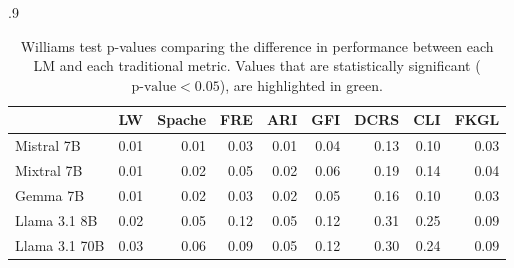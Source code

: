 \begin{table}[!htb]
    \begin{subtable}[t]{.9\textwidth}
        \centering \footnotesize
          \begin{tabular}{l|rrrrrrrr}
         & \multicolumn{1}{l}{LW} & \multicolumn{1}{l}{Spache} & \multicolumn{1}{l}{FRE} & \multicolumn{1}{l}{ARI} & \multicolumn{1}{l}{GFI} & \multicolumn{1}{l}{DCRS} & \multicolumn{1}{l}{CLI} & \multicolumn{1}{l}{FKGL} \\ \hline
        Mistral 7B & \cellcolor[HTML]{B7E1CD}0.01 & \cellcolor[HTML]{B7E1CD}0.01 & \cellcolor[HTML]{B7E1CD}0.03 & \cellcolor[HTML]{B7E1CD}0.01 & \cellcolor[HTML]{B7E1CD}0.04 & 0.13 & 0.10 & \cellcolor[HTML]{B7E1CD}0.03 \\
        Mixtral 7B & \cellcolor[HTML]{B7E1CD}0.01 & \cellcolor[HTML]{B7E1CD}0.02 & \cellcolor[HTML]{B7E1CD}0.05 & \cellcolor[HTML]{B7E1CD}0.02 & 0.06 & 0.19 & 0.14 & \cellcolor[HTML]{B7E1CD}0.04 \\
        Gemma 7B & \cellcolor[HTML]{B7E1CD}0.01 & \cellcolor[HTML]{B7E1CD}0.02 & \cellcolor[HTML]{B7E1CD}0.03 & \cellcolor[HTML]{B7E1CD}0.02 & \cellcolor[HTML]{B7E1CD}0.05 & 0.16 & 0.10 & \cellcolor[HTML]{B7E1CD}0.03 \\
        Llama 3.1 8B & \cellcolor[HTML]{B7E1CD}0.02 & 0.05 & 0.12 & \cellcolor[HTML]{B7E1CD}0.05 & 0.12 & 0.31 & 0.25 & 0.09 \\
        Llama 3.1 70B & \cellcolor[HTML]{B7E1CD}0.03 & 0.06 & 0.09 & \cellcolor[HTML]{B7E1CD}0.05 & 0.12 & 0.30 & 0.24 & 0.09 \\
        \end{tabular}
        \caption{Kendall-Tau p-values.}\label{subtab:kt-pval}
    \end{subtable} 
    \caption[Williams test p-values comparing the difference in performance between each LM and each traditional metric.]{Williams test p-values comparing the difference in performance between each LM and each traditional metric. Values that are statistically significant ($\textrm{p-value} < 0.05$), are highlighted in green.}
    \label{tab:significance-testing}
\end{table}